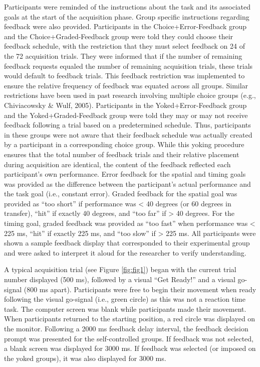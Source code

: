 \documentclass[
  man, donotrepeattitle,floatsintext]{apa7}
\begin{document}
Participants were reminded of the instructions about the task and its associated goals at the start of the acquisition phase. Group specific instructions regarding feedback were also provided. Participants in the Choice+Error-Feedback group and the Choice+Graded-Feedback group were told they could choose their feedback schedule, with the restriction that they must select feedback on 24 of the 72 acquisition trials. They were informed that if the number of remaining feedback requests equaled the number of remaining acquisition trials, these trials would default to feedback trials. This feedback restriction was implemented to ensure the relative frequency of feedback was equated across all groups. Similar restrictions have been used in past research involving multiple choice groups (e.g., Chiviacowsky \& Wulf, 2005). Participants in the Yoked+Error-Feedback group and the Yoked+Graded-Feedback group were told they may or may not receive feedback following a trial based on a predetermined schedule. Thus, participants in these groups were not aware that their feedback schedule was actually created by a participant in a corresponding choice group. While this yoking procedure ensures that the total number of feedback trials and their relative placement during acquisition are identical, the content of the feedback reflected each participant's own performance. Error feedback for the spatial and timing goals was provided as the difference between the participant's actual performance and the task goal (i.e., constant error). Graded feedback for the spatial goal was provided as ``too short'' if performance was \textless{} 40 degrees (or 60 degrees in transfer), ``hit'' if exactly 40 degrees, and ``too far'' if \textgreater{} 40 degrees. For the timing goal, graded feedback was provided as ``too fast'' when performance was \textless{} 225 ms, ``hit'' if exactly 225 ms, and ``too slow'' if \textgreater{} 225 ms. All participants were shown a sample feedback display that corresponded to their experimental group and were asked to interpret it aloud for the researcher to verify understanding.

A typical acquisition trial (see Figure \ref{fig:fig1}) began with the current trial number displayed (500 ms), followed by a visual ``Get Ready!'' and a visual go-signal (800 ms apart). Participants were free to begin their movement when ready following the visual go-signal (i.e., green circle) as this was not a reaction time task. The computer screen was blank while participants made their movement. When participants returned to the starting position, a red circle was displayed on the monitor. Following a 2000 ms feedback delay interval, the feedback decision prompt was presented for the self-controlled groups. If feedback was not selected, a blank screen was displayed for 3000 ms. If feedback was selected (or imposed on the yoked groups), it was also displayed for 3000 ms.
\end{document}

